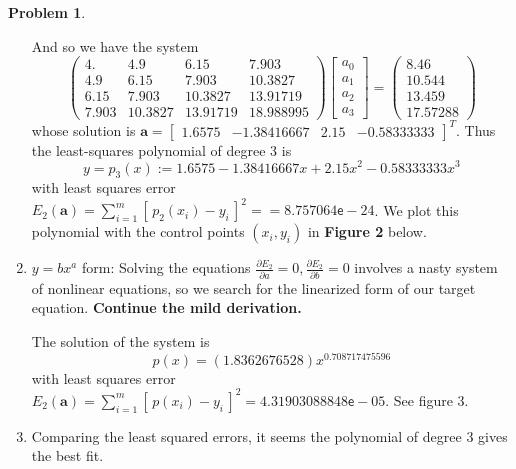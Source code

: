 \documentclass[10pt]{article}
\theoremstyle{plain}
\theoremstyle{definition}
\newtheorem{prob}{Problem}
\numberwithin{equation}{section}
\begin{document}
\begin{prob}
\begin{enumerate}[\bfseries(a)]
        And so we have the system
\[
\begin{pmatrix}
4.      &   4.9     &   6.15    &   7.903   \\
4.9     &   6.15    &   7.903   &  10.3827  \\
6.15    &   7.903   &  10.3827  &  13.91719 \\
7.903   &  10.3827  &  13.91719 &  18.988995
\end{pmatrix}
\begin{bmatrix} a_0 \\ a_1 \\ a_2 \\ a_3 \end{bmatrix}
= \begin{pmatrix} 8.46    \\ 10.544   \\ 13.459   \\ 17.57288 \end{pmatrix}
\]
whose solution is
$\bm{a} = \begin{bmatrix} 1.6575 & -1.38416667 & 2.15 & -0.58333333 \end{bmatrix}^T$. Thus
the least-squares polynomial of degree 3 is
\[
        \boxed{y = p_3(x) := 1.6575  - 1.38416667 x + 2.15 x^2  - 0.58333333 x^3}
\]
        with least squares error
        $E_2(\bm{a}) = \sum_{i=1}^m \left[\, p_2(x_i) - y_i\, \right]^2 =
            = 8.757064 \mathsf{e}-24$.
            We plot this polynomial with the control points $(x_i, y_i)$
            in \textbf{Figure 2} below.  \item   $y= bx^a$ form:
    Solving the equations $\frac{\partial E_2}{\partial a} = 0 , \frac{\partial E_2}{\partial b} = 0$
    involves a nasty system of nonlinear equations, so we search for the
    linearized form of our target equation. \textbf{Continue the mild derivation.}

    The solution of the system is
    \[\boxed{p(x) = (1.8362676528) x^{0.708717475596}}\]
    with least squares error
    $E_2(\bm{a}) = \sum_{i=1}^m \left[\, p(x_i) - y_i\, \right]^2 =  4.31903088848\mathsf{e}-05$.
    See figure 3.
\item Comparing the least squared errors, it seems the polynomial of degree 3 gives the best fit.
\end{enumerate}

\end{prob}
\end{document}
